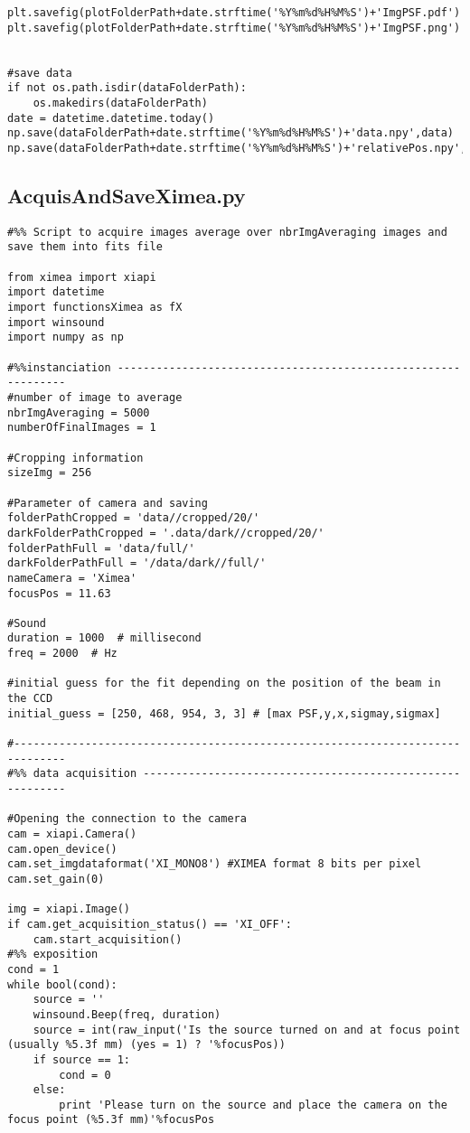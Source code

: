 \begin{lstlisting}
plt.savefig(plotFolderPath+date.strftime('%Y%m%d%H%M%S')+'ImgPSF.pdf')
plt.savefig(plotFolderPath+date.strftime('%Y%m%d%H%M%S')+'ImgPSF.png')


#save data
if not os.path.isdir(dataFolderPath):
    os.makedirs(dataFolderPath)
date = datetime.datetime.today()
np.save(dataFolderPath+date.strftime('%Y%m%d%H%M%S')+'data.npy',data)
np.save(dataFolderPath+date.strftime('%Y%m%d%H%M%S')+'relativePos.npy',relativePos)
\end{lstlisting}

\subsection{AcquisAndSaveXimea.py}
\label{subapp:AcquisAndSaveXimea}

\begin{lstlisting}
#%% Script to acquire images average over nbrImgAveraging images and save them into fits file

from ximea import xiapi
import datetime
import functionsXimea as fX
import winsound
import numpy as np

#%%instanciation --------------------------------------------------------------
#number of image to average
nbrImgAveraging = 5000
numberOfFinalImages = 1

#Cropping information
sizeImg = 256

#Parameter of camera and saving
folderPathCropped = 'data//cropped/20/'
darkFolderPathCropped = '.data/dark//cropped/20/'
folderPathFull = 'data/full/'
darkFolderPathFull = '/data/dark//full/'
nameCamera = 'Ximea'
focusPos = 11.63

#Sound
duration = 1000  # millisecond
freq = 2000  # Hz

#initial guess for the fit depending on the position of the beam in the CCD
initial_guess = [250, 468, 954, 3, 3] # [max PSF,y,x,sigmay,sigmax]

#------------------------------------------------------------------------------
#%% data acquisition ----------------------------------------------------------

#Opening the connection to the camera
cam = xiapi.Camera()
cam.open_device()
cam.set_imgdataformat('XI_MONO8') #XIMEA format 8 bits per pixel
cam.set_gain(0)

img = xiapi.Image()
if cam.get_acquisition_status() == 'XI_OFF':
    cam.start_acquisition()
#%% exposition
cond = 1
while bool(cond):
    source = ''
    winsound.Beep(freq, duration)
    source = int(raw_input('Is the source turned on and at focus point (usually %5.3f mm) (yes = 1) ? '%focusPos))
    if source == 1:
        cond = 0
    else:
        print 'Please turn on the source and place the camera on the focus point (%5.3f mm)'%focusPos


\end{lstlisting}
